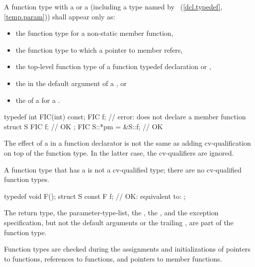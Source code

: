 \pnum
A function type with a  or a
 (including a type named by
~(\ref{dcl.typedef}, \ref{temp.param}))
shall appear only as:
\begin{itemize}
\item the function type for a non-static member function,

\item the function type to which a pointer to member refers,

\item the top-level function type of a function typedef declaration
or ,

\item the  in the default argument of a
, or

\item the  of a  for a
.
\end{itemize}
\begin{example}
\begin{codeblock}
typedef int FIC(int) const;
FIC f;              // error: does not declare a member function
struct S {
  FIC f;            // OK
};
FIC S::*pm = &S::f; // OK
\end{codeblock}
\end{example}

\pnum
The effect of a
in a function declarator is not the same as
adding cv-qualification on top of the function type.
In the latter case, the cv-qualifiers are ignored.
\begin{note}
A function type that has a  is not a
cv-qualified type; there are no cv-qualified function types.
\end{note}
\begin{example}
\begin{codeblock}
typedef void F();
struct S {
  const F f;        // OK: equivalent to: 
};
\end{codeblock}
\end{example}

\pnum
The return type, the parameter-type-list, the ,
the , and
the exception specification,
but not the default arguments
or the trailing ,
are part of the function type.
\begin{note}
Function types are checked during the assignments and initializations of
pointers to functions, references to functions, and pointers to member functions.
\end{note}

